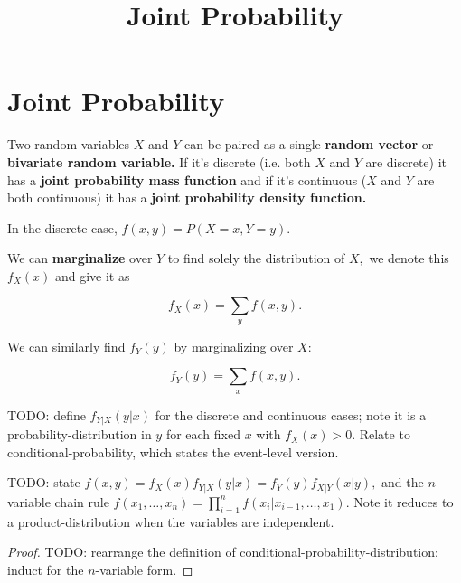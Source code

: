 \documentclass{article}
\title{Joint Probability}
\begin{document}
\section{Joint Probability}

\begin{definition}
Two \@{random-variables} $X$ and $Y$ can be paired as a single \textbf{random vector} or \textbf{bivariate random variable.} If it's discrete (i.e. both $X$ and $Y$ are discrete) it has a \textbf{joint probability mass function} and if it's continuous ($X$ and $Y$ are both continuous) it has a \textbf{joint probability density function.}

In the discrete case, $f(x,y) = P(X = x, Y = y).$
\end{definition}

\begin{definition}[Marginalization]
We can \textbf{marginalize} over $Y$ to find solely the distribution of $X,$ we denote this $f_X(x)$ and give it as

\[ f_X(x) = \sum_y f(x, y). \]

We can similarly find $f_Y(y)$ by marginalizing over $X$:

\[ f_Y(y) = \sum_x f(x, y). \]
\end{definition}

\begin{definition}
TODO: define $f_{Y|X}(y|x)$ for the discrete and continuous cases; note it is a \@{probability-distribution} in $y$ for each fixed $x$ with $f_X(x) > 0.$ Relate to \@{conditional-probability}, which states the event-level version.
\end{definition}

\begin{theorem}\label{joint-is-marginal-times-conditional}
TODO: state $f(x,y) = f_X(x) f_{Y|X}(y|x) = f_Y(y) f_{X|Y}(x|y),$ and the $n$-variable chain rule $f(x_1, \dots, x_n) = \prod_{i=1}^n f(x_i | x_{i-1}, \dots, x_1).$ Note it reduces to a \@{product-distribution} when the variables are \@{independent}.
\end{theorem}
\begin{proof}
TODO: rearrange the definition of \@{conditional-probability-distribution}; induct for the $n$-variable form.
\end{proof}
\end{document}
